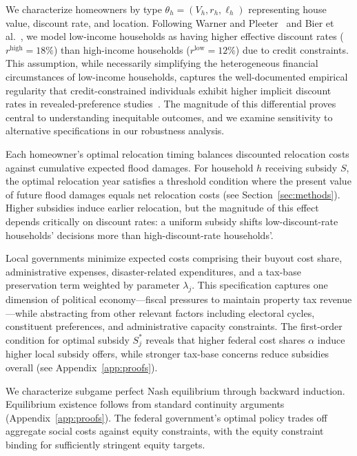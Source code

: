 \documentclass[11pt,letterpaper]{article}
\theoremstyle{definition}
\begin{document}
We characterize homeowners by type $\theta_h = (V_h, r_h, \ell_h)$ representing house value, discount rate, and location. Following Warner and Pleeter~\cite{warner2001personal} and Bier et al.~\cite{bier2019game}, we model low-income households as having higher effective discount rates ($r^{\text{high}} = 18\%$) than high-income households ($r^{\text{low}} = 12\%$) due to credit constraints. This assumption, while necessarily simplifying the heterogeneous financial circumstances of low-income households, captures the well-documented empirical regularity that credit-constrained individuals exhibit higher implicit discount rates in revealed-preference studies~\cite{hausman1979individual, frederick2002time}. The magnitude of this differential proves central to understanding inequitable outcomes, and we examine sensitivity to alternative specifications in our robustness analysis.

Each homeowner's optimal relocation timing balances discounted relocation costs against cumulative expected flood damages. For household $h$ receiving subsidy $S$, the optimal relocation year satisfies a threshold condition where the present value of future flood damages equals net relocation costs (see Section~\ref{sec:methods}). Higher subsidies induce earlier relocation, but the magnitude of this effect depends critically on discount rates: a uniform subsidy shifts low-discount-rate households' decisions more than high-discount-rate households'.

Local governments minimize expected costs comprising their buyout cost share, administrative expenses, disaster-related expenditures, and a tax-base preservation term weighted by parameter $\lambda_j$. This specification captures one dimension of political economy---fiscal pressures to maintain property tax revenue---while abstracting from other relevant factors including electoral cycles, constituent preferences, and administrative capacity constraints. The first-order condition for optimal subsidy $S_j^*$ reveals that higher federal cost shares $\alpha$ induce higher local subsidy offers, while stronger tax-base concerns reduce subsidies overall (see Appendix~\ref{app:proofs}).

We characterize subgame perfect Nash equilibrium through backward induction. Equilibrium existence follows from standard continuity arguments (Appendix~\ref{app:proofs}). The federal government's optimal policy trades off aggregate social costs against equity constraints, with the equity constraint binding for sufficiently stringent equity targets.
\end{document}
